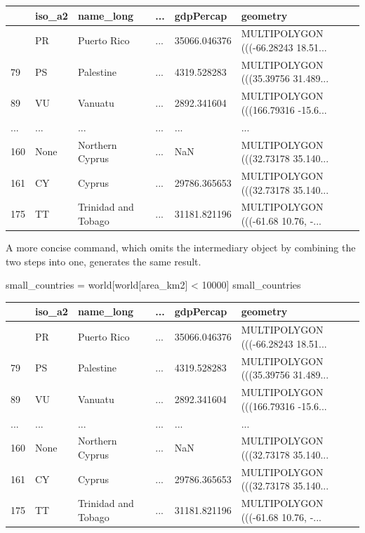 \documentclass[
  letterpaper,
]{krantz}
\newenvironment{Shaded}{\begin{snugshade}}{\end{snugshade}}
\newcommand{\DecValTok}[1]{\textcolor[rgb]{0.68,0.00,0.00}{#1}}
\newcommand{\NormalTok}[1]{\textcolor[rgb]{0.00,0.23,0.31}{#1}}
\newcommand{\OperatorTok}[1]{\textcolor[rgb]{0.37,0.37,0.37}{#1}}
\newcommand{\StringTok}[1]{\textcolor[rgb]{0.13,0.47,0.30}{#1}}
\begin{document}
\begin{longtable}[]{@{}llllll@{}}
\toprule\noalign{}
& iso\_a2 & name\_long & ... & gdpPercap & geometry \\
\midrule\noalign{}
\endhead
\bottomrule\noalign{}
\endlastfoot
45 & PR & Puerto Rico & ... & 35066.046376 & MULTIPOLYGON (((-66.28243
18.51... \\
79 & PS & Palestine & ... & 4319.528283 & MULTIPOLYGON (((35.39756
31.489... \\
89 & VU & Vanuatu & ... & 2892.341604 & MULTIPOLYGON (((166.79316
-15.6... \\
... & ... & ... & ... & ... & ... \\
160 & None & Northern Cyprus & ... & NaN & MULTIPOLYGON (((32.73178
35.140... \\
161 & CY & Cyprus & ... & 29786.365653 & MULTIPOLYGON (((32.73178
35.140... \\
175 & TT & Trinidad and Tobago & ... & 31181.821196 & MULTIPOLYGON
(((-61.68 10.76, -... \\
\end{longtable}

A more concise command, which omits the intermediary object by combining
the two steps into one, generates the same result.

\begin{Shaded}
\begin{Highlighting}[]
\NormalTok{small\_countries }\OperatorTok{=}\NormalTok{ world[world[}\StringTok{\textquotesingle{}area\_km2\textquotesingle{}}\NormalTok{] }\OperatorTok{\textless{}} \DecValTok{10000}\NormalTok{]}
\NormalTok{small\_countries}
\end{Highlighting}
\end{Shaded}

\begin{longtable}[]{@{}llllll@{}}
\toprule\noalign{}
& iso\_a2 & name\_long & ... & gdpPercap & geometry \\
\midrule\noalign{}
\endhead
\bottomrule\noalign{}
\endlastfoot
45 & PR & Puerto Rico & ... & 35066.046376 & MULTIPOLYGON (((-66.28243
18.51... \\
79 & PS & Palestine & ... & 4319.528283 & MULTIPOLYGON (((35.39756
31.489... \\
89 & VU & Vanuatu & ... & 2892.341604 & MULTIPOLYGON (((166.79316
-15.6... \\
... & ... & ... & ... & ... & ... \\
160 & None & Northern Cyprus & ... & NaN & MULTIPOLYGON (((32.73178
35.140... \\
161 & CY & Cyprus & ... & 29786.365653 & MULTIPOLYGON (((32.73178
35.140... \\
175 & TT & Trinidad and Tobago & ... & 31181.821196 & MULTIPOLYGON
(((-61.68 10.76, -... \\
\end{longtable}
\end{document}
